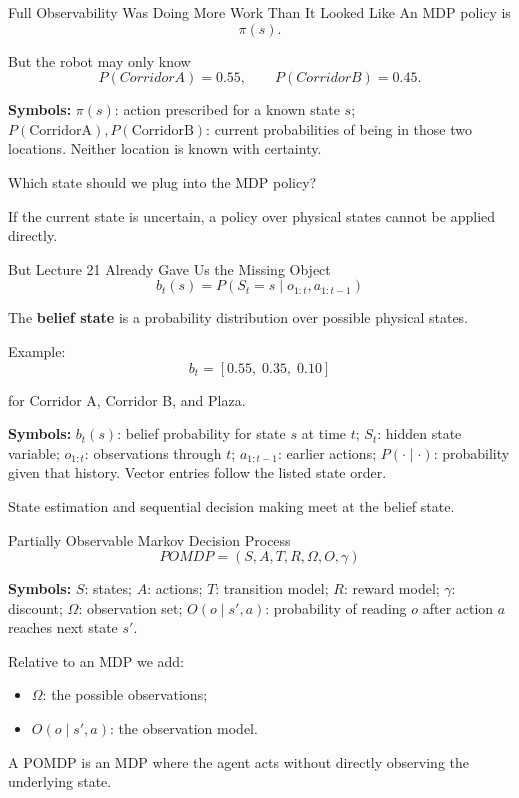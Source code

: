 \documentclass[aspectratio=169,10pt]{beamer}
\newcommand{\equationlegend}[1]{%
  \par\smallskip
  \begingroup
    \setlength{\fboxsep}{4pt}%
    \noindent\colorbox{DeckSoft}{%
      \parbox{\dimexpr\linewidth-2\fboxsep\relax}{%
        \footnotesize\textbf{Symbols:} #1%
      }%
    }\par
  \endgroup
  \smallskip
}
\begin{document}
\begin{frame}[shrink=10]{Full Observability Was Doing More Work Than It Looked Like}
  An MDP policy is
  \[
    \pi(s).
  \]

  But the robot may only know
  \[
    P(CorridorA)=0.55,
    \qquad
    P(CorridorB)=0.45.
  \]
  \equationlegend{$\pi(s)$: action prescribed for a known state $s$; $P(\text{CorridorA}),P(\text{CorridorB})$: current probabilities of being in those two locations. Neither location is known with certainty.}

  Which state should we plug into the MDP policy?

  \begin{keyidea}
    If the current state is uncertain, a policy over physical states cannot be applied directly.
  \end{keyidea}
\end{frame}

\begin{frame}[shrink=10]{But Lecture 21 Already Gave Us the Missing Object}
  \[
    b_t(s)=P(S_t=s\mid o_{1:t},a_{1:t-1})
  \]

  The \textbf{belief state} is a probability distribution over possible physical states.

  Example:
  \[
    b_t=[0.55,\;0.35,\;0.10]
  \]

  for Corridor A, Corridor B, and Plaza.
  \equationlegend{$b_t(s)$: belief probability for state $s$ at time $t$; $S_t$: hidden state variable; $o_{1:t}$: observations through $t$; $a_{1:t-1}$: earlier actions; $P(\cdot\mid\cdot)$: probability given that history. Vector entries follow the listed state order.}

  \begin{keyidea}
    State estimation and sequential decision making meet at the belief state.
  \end{keyidea}
\end{frame}

\begin{frame}[shrink=10]{Partially Observable Markov Decision Process}
  \[
    \boxed{POMDP=(S,A,T,R,\Omega,O,\gamma)}
  \]
  \equationlegend{$S$: states; $A$: actions; $T$: transition model; $R$: reward model; $\gamma$: discount; $\Omega$: observation set; $O(o\mid s',a)$: probability of reading $o$ after action $a$ reaches next state $s'$.}

  Relative to an MDP we add:
  \begin{itemize}
    \item $\Omega$: the possible observations;
    \item $O(o\mid s',a)$: the observation model.
  \end{itemize}

  \begin{keyidea}
    A POMDP is an MDP where the agent acts without directly observing the underlying state.
  \end{keyidea}
\end{frame}
\end{document}
